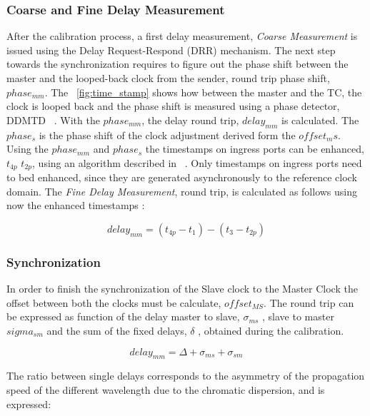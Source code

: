 \subsubsection{Coarse and Fine Delay Measurement}

After the calibration process, a first delay measurement, \textit{Coarse
Measurement} is issued using the Delay Request-Respond (DRR) mechanism. 
The next step towards the synchronization requires to figure out the phase shift
between the master and the looped-back clock from the sender, round trip 
phase shift, $phase_{mm}$. The ~\ref{fig:time_stamp} shows how between the 
master and the TC, the clock is looped back and the phase shift is measured 
using a phase detector, DDMTD ~\cite{biblio:ddmtd}. With the
$phase_{mm}$, the delay round trip, $delay_{mm}$ is calculated. The $phase_{s}$
is the phase shift of the clock adjustment derived form the $offset_ms$. Using the 
$phase_{mm}$ and $phase_{s}$ the timestamps on ingress ports can be enhanced, $t_{4p}$  $t_{2p}$,
using an algorithm described in ~\cite{biblio:tomas}.
Only timestamps on ingress ports need to bed enhanced, since they are generated 
asynchronously to the reference clock domain. The \textit{Fine Delay Measurement}, round trip,
is calculated as follows using now the enhanced timestamps :

\begin{equation}
  \label{eq:round_trip}
    delay_{mm} = (t_{4p} - t_1) - (t_3 - t_{2p})
\end{equation}

\subsubsection{Synchronization}

In order to finish the synchronization of the Slave clock to the Master Clock
the offset between both the clocks must be calculate, $offset_{MS}$. The round
trip can be expressed as function of the  delay master to slave, $\sigma _{ms}$ , slave to
master $sigma _{sm}$ and the sum of the fixed delays, $\delta$ , obtained during the calibration.

\begin{equation}
  \label{eq:round_trip_2}
    delay_{mm} = \Delta + \sigma _{ms} + \sigma _{sm}
\end{equation}

The ratio between single delays corresponds to the asymmetry of the propagation speed of
the different wavelength due to the chromatic dispersion, and is expressed:

